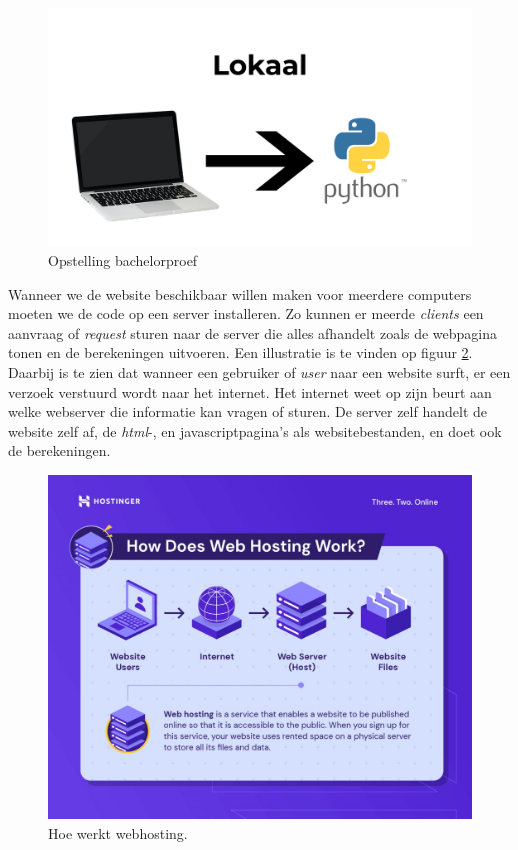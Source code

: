 \begin{figure}
    \centering
    \includegraphics[width=1\textwidth]{./img/lokaal_website}
    \caption{\label{fig:opstelling_bachelorproef} Opstelling bachelorproef}
\end{figure}

Wanneer we de website beschikbaar willen maken voor meerdere computers moeten we de code op een server installeren. Zo kunnen er meerde \textit{clients} een aanvraag of \textit{request} sturen naar de server die alles afhandelt zoals de webpagina tonen en de berekeningen uitvoeren. Een illustratie is te vinden op figuur \ref{fig:webhosting_scheme}. Daarbij is te zien dat wanneer een gebruiker of \textit{user} naar een website surft, er een verzoek verstuurd wordt naar het internet. Het internet weet op zijn beurt aan welke webserver die informatie kan vragen of sturen. De server zelf handelt de website zelf af, de \textit{html}-, en javascriptpagina's als websitebestanden, en doet ook de berekeningen.

\begin{figure}
    \centering
    \includegraphics[width=1\textwidth]{./img/how-does-web-hosting-work}
    \caption{\label{fig:webhosting_scheme} Hoe werkt webhosting.~\autocite{Tamara2022}}
\end{figure}

